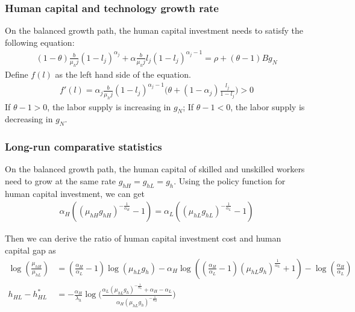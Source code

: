 \documentclass[12pt]{article}
\begin{document}
\subsubsection*{Human capital and technology growth rate}
On the balanced growth path, the human capital investment needs to satisfy the following equation: 
\begin{align*}
(1-\theta)\frac{b}{\mu_hj}(1-l_j)^{\alpha_j}+\alpha\frac{b}{\mu_hj}l_j(1-l_j)^{\alpha_j-1} = \rho+(\theta-1)Bg_N
\end{align*}
Define $f(l)$ as the left hand side of the equation. 
\begin{align*}
f'(l) = \alpha_j\frac{b}{\mu_hj}(1-l_j)^{\alpha_j-1}\big(\theta+(1-\alpha_j)\frac{l_j}{1-l_j}\big)>0
\end{align*}
If $\theta-1>0$, the labor supply is increasing in $g_N$; If $\theta-1<0$, the labor supply is decreasing in $g_N$. 

\subsubsection*{Long-run comparative statistics}
On the balanced growth path, the human capital of skilled and unskilled workers need to grow at the same rate $g_{hH} = g_{hL} = g_h$. Using the policy function for human capital investment, we can get
\begin{align*}
\alpha_H((\mu_{hH}g_{hH})^{-\frac{1}{\alpha_H}}-1) = \alpha_L((\mu_{hL}g_{hL})^{-\frac{1}{\alpha_L}}-1)
\end{align*}

Then we can derive the ratio of human capital investment cost and human capital gap as
\begin{align*}
\log(\frac{\mu_{hH}}{\mu_{hL}}) &= (\frac{\alpha_H}{\alpha_L}-1)\log(\mu_{hL}g_h)-\alpha_H\log((\frac{\alpha_H}{\alpha_L}-1)(\mu_{hL}g_h)^{\frac{1}{\alpha_L}}+1)-\log(\frac{\alpha_H}{\alpha_L}) \\
h_{HL}-h_{HL}^*&= -\frac{\alpha_H}{\lambda_h}\log \Big(\frac{\alpha_L(\mu_{hL}g_h)^{-\frac{1}{\alpha_L}}+\alpha_H-\alpha_L}{\alpha_H(\mu_{hL}g_h)^{-\frac{1}{\alpha_H}}}\Big)
\end{align*}
\end{document}
